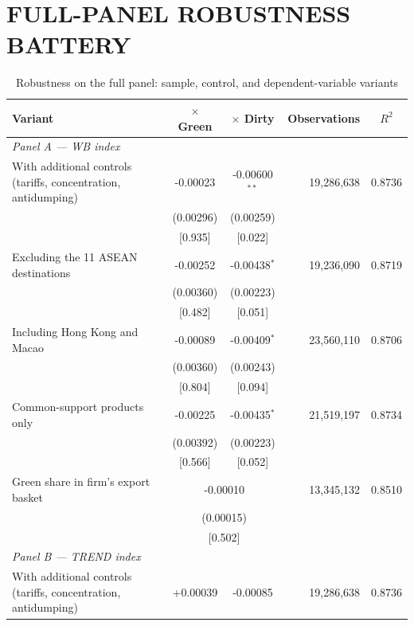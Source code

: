 \documentclass{article}
\begin{document}
\newpage
\section{FULL-PANEL ROBUSTNESS BATTERY}

\begin{table}[htbp]
\centering
\footnotesize
\caption{Robustness on the full panel: sample, control, and dependent-variable variants}
\label{tab:robust-full}
\begin{threeparttable}
\begin{tabular}{lccrc}
\toprule
Variant & $\times$ Green & $\times$ Dirty & Observations & $R^2$ \\
\midrule
\multicolumn{5}{l}{\textit{Panel A --- WB index}} \\
\addlinespace
With additional controls (tariffs, concentration, antidumping) & -0.00023 & -0.00600$^{**}$ & 19,286,638 & 0.8736 \\
 & (0.00296) & (0.00259) & & \\
 & [0.935] & [0.022] & & \\
\addlinespace
Excluding the 11 ASEAN destinations & -0.00252 & -0.00438$^{*}$ & 19,236,090 & 0.8719 \\
 & (0.00360) & (0.00223) & & \\
 & [0.482] & [0.051] & & \\
\addlinespace
Including Hong Kong and Macao & -0.00089 & -0.00409$^{*}$ & 23,560,110 & 0.8706 \\
 & (0.00360) & (0.00243) & & \\
 & [0.804] & [0.094] & & \\
\addlinespace
Common-support products only & -0.00225 & -0.00435$^{*}$ & 21,519,197 & 0.8734 \\
 & (0.00392) & (0.00223) & & \\
 & [0.566] & [0.052] & & \\
\addlinespace
Green share in firm's export basket & \multicolumn{2}{c}{-0.00010} & 13,345,132 & 0.8510 \\
 & \multicolumn{2}{c}{(0.00015)} & & \\
 & \multicolumn{2}{c}{[0.502]} & & \\
\midrule
\multicolumn{5}{l}{\textit{Panel B --- TREND index}} \\
\addlinespace
With additional controls (tariffs, concentration, antidumping) & +0.00039 & -0.00085 & 19,286,638 & 0.8736 \\

\end{tabular}
\end{threeparttable}
\end{table}
\end{document}

